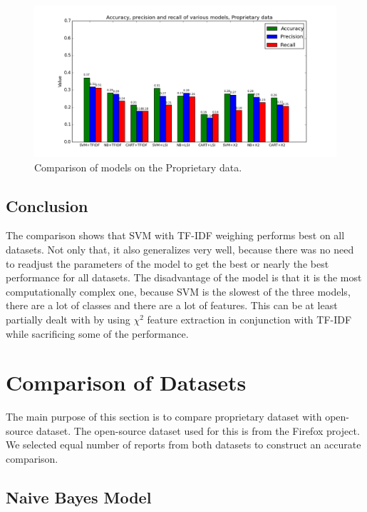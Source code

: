 \begin{figure}[htbp]
    \centering
        \includegraphics[width=\textwidth]{./images/comparison_of_models/proprietary.png}
    \caption{Comparison of models on the Proprietary data.}
    \label{fig:results.models.proprietary}
\end{figure}

\subsection{Conclusion}

The comparison shows that SVM with TF-IDF weighing performs best on all datasets. Not only that, it also generalizes very well, because there was no need to readjust the parameters of the model to get the best or nearly the best performance for all datasets. The disadvantage of the model is that it is the most computationally complex one, because SVM is the slowest of the three models, there are a lot of classes and there are a lot of features. This can be at least partially dealt with by using $\chi^2$ feature extraction in conjunction with TF-IDF while sacrificing some of the performance.

\section{Comparison of Datasets}

The main purpose of this section is to compare proprietary dataset with open-source dataset. The open-source dataset used for this is from the Firefox project. We selected equal number of reports from both datasets to construct an accurate comparison.

\subsection{Naive Bayes Model}

